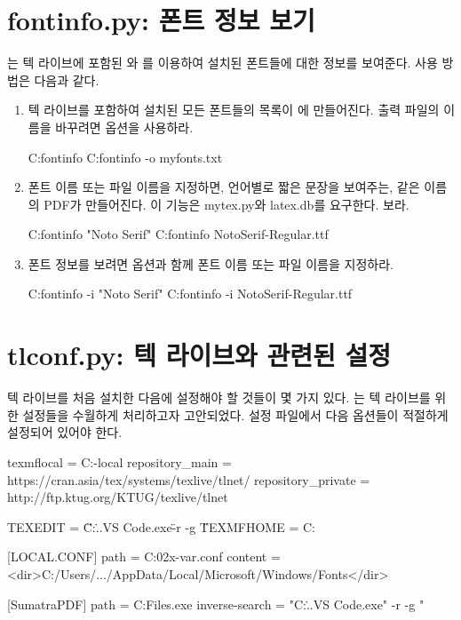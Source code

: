 \section{fontinfo.py: 폰트 정보 보기}

는 텍 라이브에 포함된 와 를 이용하여 설치된 폰트들에 대한 정보를 보여준다.
사용 방법은 다음과 같다.

\begin{enumerate}

\item 텍 라이브를 포함하여 설치된 모든 폰트들의 목록이 에 만들어진다.
출력 파일의 이름을 바꾸려면  옵션을 사용하라.

\begin{code}
C:\>fontinfo 
C:\>fontinfo -o myfonts.txt
\end{code}

\item 폰트 이름 또는 파일 이름을 지정하면, 언어별로 짧은 문장을 보여주는, 같은 이름의 PDF가 만들어진다. 
이 기능은 mytex.py와 latex.db를 요구한다.
\을 보라.

\begin{code}
C:\>fontinfo "Noto Serif"
C:\>fontinfo NotoSerif-Regular.ttf
\end{code}

\item 폰트 정보를 보려면  옵션과 함께 폰트 이름 또는 파일 이름을 지정하라.

\begin{code}
C:\>fontinfo -i "Noto Serif"
C:\>fontinfo -i NotoSerif-Regular.ttf
\end{code}

\end{enumerate}

\section{tlconf.py: 텍 라이브와 관련된 설정}

텍 라이브를 처음 설치한 다음에 설정해야 할 것들이 몇 가지 있다.
는 텍 라이브를 위한 설정들을 수월하게 처리하고자 고안되었다.
 설정 파일에서 다음 옵션들이 적절하게 설정되어 있어야 한다.

\begin{codewrite}
texmflocal = C:\texlive\texmf-local\tex\latex\local
repository_main = https://cran.asia/tex/systems/texlive/tlnet/
repository_private = http://ftp.ktug.org/KTUG/texlive/tlnet

TEXEDIT = \"C:\...\Microsoft VS Code\code.exe\" -r -g \"%
TEXMFHOME = C:\home\texmf

[LOCAL.CONF]
path = C:\texlive\202x\texmf-var\fonts\conf\local.conf
content = <dir>C:/Users/.../AppData/Local/Microsoft/Windows/Fonts</dir>

[SumatraPDF]
path = C:\Program Files\SumatraPDF\SumatraPDF.exe
inverse-search = "C:\...\Microsoft VS Code\code.exe" -r -g "%
\end{codewrite}
\coderead[language=ini] 

